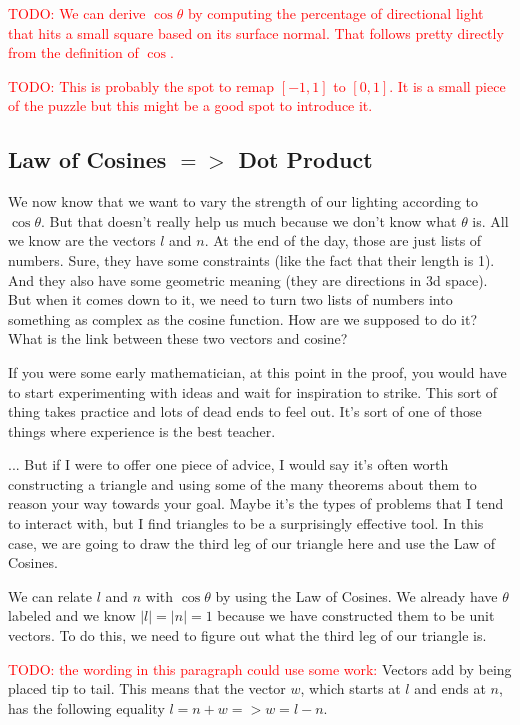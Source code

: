 \documentclass{article}
\newcommand\todo[1]{\textcolor{red}{TODO: #1}}
\begin{document}
\todo{We can derive $\cos \theta$ by computing the percentage of directional light that hits a small square based on its surface normal.
That follows pretty directly from the definition of $\cos$.}

\todo{This is probably the spot to remap $[-1, 1]$ to $[0, 1]$. It is a small piece of the puzzle but this might be a good spot to introduce it.}

\subsection{Law of Cosines $=>$ Dot Product}

We now know that we want to vary the strength of our lighting according to $\cos \theta$.
But that doesn't really help us much because we don't know what $\theta$ is.
All we know are the vectors $l$ and $n$.
At the end of the day, those are just lists of numbers.
Sure, they have some constraints (like the fact that their length is 1).
And they also have some geometric meaning (they are directions in 3d space).
But when it comes down to it, we need to turn two lists of numbers into something as complex as the cosine function.
How are we supposed to do it?
What is the link between these two vectors and cosine?

If you were some early mathematician, at this point in the proof, you would have to start experimenting with ideas and wait for inspiration to strike.
This sort of thing takes practice and lots of dead ends to feel out.
It's sort of one of those things where experience is the best teacher.

... But if I were to offer one piece of advice, I would say it's often worth constructing a triangle and using some of the many theorems about them to reason your way towards your goal.
Maybe it's the types of problems that I tend to interact with, but I find triangles to be a surprisingly effective tool.
In this case, we are going to draw the third leg of our triangle here and use the Law of Cosines.

We can relate $l$ and $n$ with $\cos \theta$ by using the Law of Cosines.
We already have $\theta$ labeled and we know $|l| = |n| = 1$ because we have constructed them to be unit vectors.
To do this, we need to figure out what the third leg of our triangle is.

\todo{the wording in this paragraph could use some work:}
Vectors add by being placed tip to tail.
This means that the vector $w$, which starts at $l$ and ends at $n$, has the following equality $l = n + w => w = l - n$.
\end{document}

